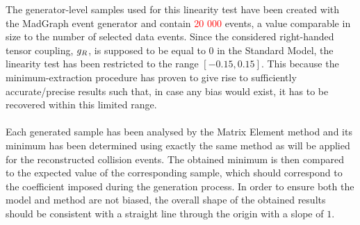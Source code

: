 The generator-level samples used for this linearity test have been created with the MadGraph event generator and contain \textcolor{red}{20 000} events, a value comparable in size to the number of selected data events. 
Since the considered right-handed tensor coupling, $g_{R}$, is supposed to be equal to $0$ in the Standard Model, the linearity test has been restricted to the range $\left[-0.15, 0.15\right]$.
This because the minimum-extraction procedure has proven to give rise to sufficiently accurate/precise results such that, in case any bias would exist, it has to be recovered within this limited range.
\\
\\
Each generated sample has been analysed by the Matrix Element method and its minimum has been determined using exactly the same method as will be applied for the reconstructed collision events.
The obtained minimum is then compared to the expected value of the corresponding sample, which should correspond to the coefficient imposed during the generation process.
In order to ensure both the model and method are not biased, the overall shape of the obtained results should be consistent with a straight line through the origin with a slope of $1$.
\\

